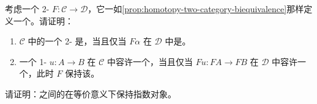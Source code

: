 \begin{exercise}\label{ex:two-categorical-biequivalence}
考虑一个 2-\trFunctor{} $F\colon\mathcal{C}\to\mathcal{D}$，它一如\cref{prop:homotopy-two-category-biequivalence}那样定义一个\trBiequivalence。请证明：
\begin{enumerate}[label=(\roman*)]
\item $\mathcal{C}$ 中的一个 2-\trCell{}
  是\trInvertible，当且仅当 $F\alpha$ 在 $\mathcal{D}$ 中是\trInvertible。
\item 一个 1-\trCell{} $u\colon A\to B$ 在 $\mathcal{C}$ 中容许一个\trLeftAdjoint，当且仅当 $Fu\colon FA\to FB$ 在 $\mathcal{D}$ 中容许一个\trLeftAdjoint，此时 $F$ 保持该\trAdjunction。
\end{enumerate}
\end{exercise}

\begin{exercise}\label{ex:cartesian-closed-exponentials}
请证明：\trCartesianClosed\trInfinityCosmos{}之间的\trCosmologicalBiequivalence{}在等价意义下保持指数对象。
\end{exercise}

